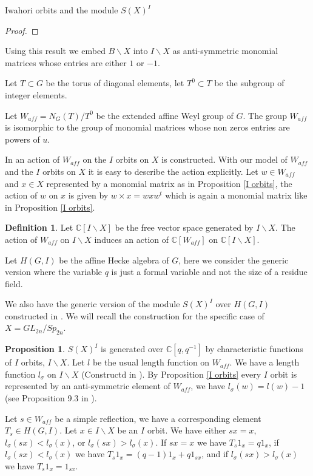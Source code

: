 \documentclass[12pt]{article}
\newcommand{\C}{\mathbb{C}}
\newcommand{\<}{\langle}
\renewcommand{\>}{\rangle}
\theoremstyle{plain}
\theoremstyle{definition}
\newtheorem{prop}[theorem]{Proposition}
\newtheorem{defn}[theorem]{Definition}
\begin{document}
\begin{section}{Iwahori orbits and the module $S(X)^I$}
\begin{proof}
    
\end{proof}

Using this result we embed $B\backslash X$ into $I\backslash X$ as anti-symmetric monomial matrices whose entries are either $1$ or $-1$.

Let $T\subset G$ be the torus of diagonal elements, let $T^0\subset T$ be the subgroup of integer elements. 

Let $W_{aff}=N_G(T)/T^0$ be the extended affine Weyl group of $G$. The group $W_{aff}$ is isomorphic to the group of monomial matrices whose non zeros entries are powers of $u$.  

In \cite{my} an action of $W_{aff}$ on the $I$ orbits on $X$ is constructed. With our model of $W_{aff}$ and the $I$ orbits on $X$ it is easy to describe the action explicitly. Let $w\in W_{aff}$ and $x\in X$ represented by a monomial matrix as in Proposition \ref{I orbits}, the action of $w$ on $x$ is given by $w\times x= wxw^t$ which is again a monomial matrix like in Proposition \ref{I orbits}. 

\begin{defn}
    Let $\C[I\backslash X]$ be the free vector space generated by $I\backslash X$. The action of $W_{aff}$ on $I\backslash X$ induces an action of $\C[W_{aff}]$ on $\C[I\backslash X]$.
\end{defn}

Let $H(G,I)$ be the affine Hecke algebra of $G$, here we consider the generic version where the variable $q$ is just a formal variable and not the size of a residue field. 

We also have the generic version of the module $S(X)^I$ over $H(G,I)$ constructed in \cite{my}. We will recall the construction for the specific case of $X=GL_{2n}/Sp_{2n}$.

\begin{prop}
 $S(X)^I$ is generated over $\C[q,q^{-1}]$ by characteristic functions of $I$ orbits, $I\backslash X$. Let $l$ be the usual length function on $W_{aff}$. We have a length function $l_\sigma$ on $I\backslash X$ (Constructd in \cite{my}). By Proposition \ref{I orbits} every $I$ orbit is represented by an anti-symmetric element of $W_{aff}$, we have $l_\sigma(w)=l(w)-1$ (see Proposition 9.3 in \cite{my}).

Let $s\in W_{aff}$ be a simple reflection, we have a corresponding element $T_s\in H(G,I)$. Let $x\in I\backslash X$ be an $I$ orbit. We have either $sx=x$, $l_\sigma(sx)<l_\sigma(x)$, or $l_\sigma(sx)>l_\sigma(x)$. If $sx=x$ we have $T_s1_x=q1_x$, if $l_\sigma(sx)<l_\sigma(x)$ we have  $T_s1_x=(q-1)1_x+q1_{sx}$, and if $l_\sigma(sx)>l_\sigma(x)$ we have $T_s1_x=1_{sx}$. 


\end{prop}
\end{section}
\end{document}
